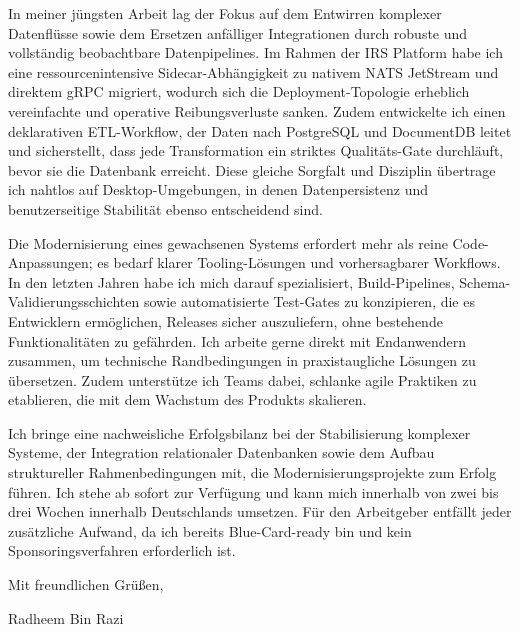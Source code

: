 \documentclass[11pt,a4paper]{coverletter}
\begin{document}
In meiner jüngsten Arbeit lag der Fokus auf dem Entwirren komplexer Datenflüsse sowie dem Ersetzen anfälliger Integrationen durch robuste und vollständig beobachtbare Datenpipelines. Im Rahmen der IRS Platform habe ich eine ressourcenintensive Sidecar-Abhängigkeit zu nativem NATS JetStream und direktem gRPC migriert, wodurch sich die Deployment-Topologie erheblich vereinfachte und operative Reibungsverluste sanken. Zudem entwickelte ich einen deklarativen ETL-Workflow, der Daten nach PostgreSQL und DocumentDB leitet und sicherstellt, dass jede Transformation ein striktes Qualitäts-Gate durchläuft, bevor sie die Datenbank erreicht. Diese gleiche Sorgfalt und Disziplin übertrage ich nahtlos auf Desktop-Umgebungen, in denen Datenpersistenz und benutzerseitige Stabilität ebenso entscheidend sind.

Die Modernisierung eines gewachsenen Systems erfordert mehr als reine Code-Anpassungen; es bedarf klarer Tooling-Lösungen und vorhersagbarer Workflows. In den letzten Jahren habe ich mich darauf spezialisiert, Build-Pipelines, Schema-Validierungsschichten sowie automatisierte Test-Gates zu konzipieren, die es Entwicklern ermöglichen, Releases sicher auszuliefern, ohne bestehende Funktionalitäten zu gefährden. Ich arbeite gerne direkt mit Endanwendern zusammen, um technische Randbedingungen in praxistaugliche Lösungen zu übersetzen. Zudem unterstütze ich Teams dabei, schlanke agile Praktiken zu etablieren, die mit dem Wachstum des Produkts skalieren.

Ich bringe eine nachweisliche Erfolgsbilanz bei der Stabilisierung komplexer Systeme, der Integration relationaler Datenbanken sowie dem Aufbau struktureller Rahmenbedingungen mit, die Modernisierungsprojekte zum Erfolg führen. Ich stehe ab sofort zur Verfügung und kann mich innerhalb von zwei bis drei Wochen innerhalb Deutschlands umsetzen. Für den Arbeitgeber entfällt jeder zusätzliche Aufwand, da ich bereits Blue-Card-ready bin und kein Sponsoringsverfahren erforderlich ist.

\closing{Mit freundlichen Grüßen,}{Radheem Bin Razi}
\end{document}

